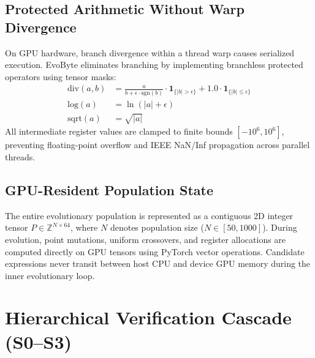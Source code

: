 \documentclass[11pt,a4paper]{article}
\begin{document}
\subsection{Protected Arithmetic Without Warp Divergence}
On GPU hardware, branch divergence within a thread warp causes serialized execution. EvoByte eliminates branching by implementing branchless protected operators using tensor masks:
\begin{align}
    \text{div}(a, b) &= \frac{a}{b + \epsilon \cdot \text{sgn}(b)} \cdot \mathbf{1}_{\{|b| > \epsilon\}} + 1.0 \cdot \mathbf{1}_{\{|b| \le \epsilon\}} \\
    \text{log}(a) &= \ln(|a| + \epsilon) \\
    \text{sqrt}(a) &= \sqrt{|a|}
\end{align}
All intermediate register values are clamped to finite bounds $[-10^6, 10^6]$, preventing floating-point overflow and IEEE NaN/Inf propagation across parallel threads.

\subsection{GPU-Resident Population State}
The entire evolutionary population is represented as a contiguous 2D integer tensor $P \in \mathbb{Z}^{N \times 64}$, where $N$ denotes population size ($N \in [50, 1000]$). During evolution, point mutations, uniform crossovers, and register allocations are computed directly on GPU tensors using PyTorch vector operations. Candidate expressions never transit between host CPU and device GPU memory during the inner evolutionary loop.

\section{Hierarchical Verification Cascade (S0--S3)}
\end{document}
